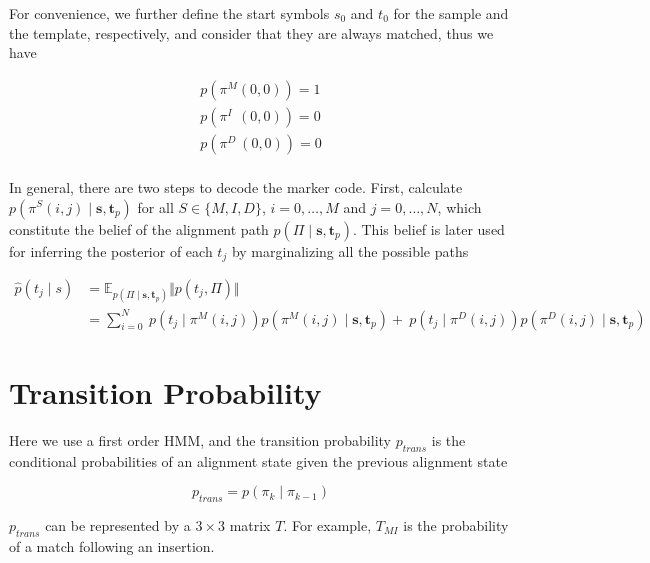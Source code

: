 \documentclass[10pt]{article}
\begin{document}
  For convenience, we further define the start symbols $s_0$ and $t_0$ for the sample and the template, respectively, and consider that they are always matched, thus we have

  \begin{equation} \label{eq001}
    \begin{aligned}
      p\left(\pi^M(0, 0)\right) = 1 \\
      p\left(\pi^{I\;\;}(0, 0)\right) = 0 \\
      p\left(\pi^{D\;}(0, 0)\right) = 0 \\
    \end{aligned}
  \end{equation}

  In general, there are two steps to decode the marker code. First, calculate $p\left(\pi^S(i, j) \;|\; \mathbf{s}, \mathbf{t}_p\right)$ for all $S \in \{M, I, D\}$, $i = 0, \dots, M$ and $j=0, \dots,N$, which constitute the belief of the alignment path $p(\Pi \;|\; \mathbf{s}, \mathbf{t}_p)$. This belief is later used for inferring the posterior of each $t_j$ by marginalizing all the possible paths

  \begin{equation}
  \begin{aligned}
    \hat{p}(t_j \;|\; s) &= \mathbb{E}_{p(\Pi \;|\; \mathbf{s}, \mathbf{t}_p)} \Vert p(t_j, \Pi) \Vert \\
    &= \sum\nolimits_{i=0}^N \
    p\left(t_j \;|\; \pi^M(i, j) \right) p\left(\pi^M(i, j) \;|\; \mathbf{s}, \mathbf{t}_p\right) + \
    p\left(t_j \;|\; \pi^D(i, j) \right) p\left(\pi^D(i, j) \;|\; \mathbf{s}, \mathbf{t}_p\right)
  \end{aligned}
  \end{equation}


\section{Transition Probability}

  Here we use a first order HMM, and the transition probability $ p_{trans}$ is the conditional probabilities of an alignment state given the previous alignment state

  \begin{equation}
    p_{trans} = p(\pi_k \;|\; \pi_{k-1})
  \end{equation}

  $p_{trans}$ can be represented by a $3 \times 3$ matrix $T$. For example, $T_{MI}$ is the probability of a match following an insertion.
\end{document}
